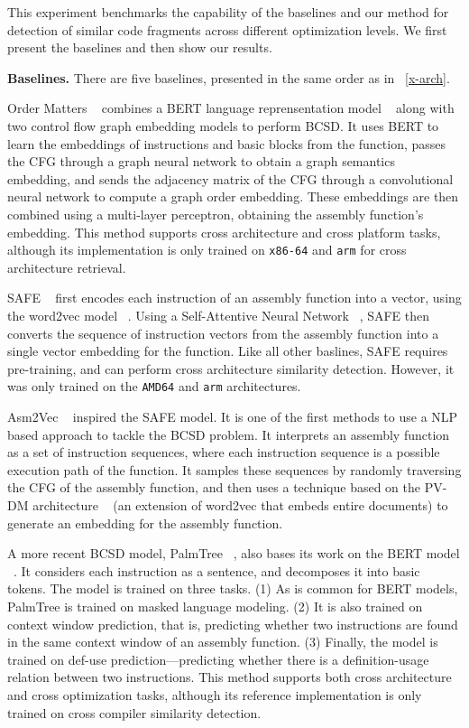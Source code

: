 This experiment benchmarks the capability of the baselines and our method for detection of similar code fragments across
different optimization levels. We first present the baselines and then show our results.

\noindent \textbf{Baselines.} There are five baselines, presented in the same order as in ~\autoref{x-arch}.

Order Matters ~\cite{OrderMatters} combines a BERT language reprensentation
model ~\cite{BERT} along with two control flow graph embedding models
to perform BCSD. It uses BERT to learn the embeddings of instructions and basic blocks from the function,
passes the CFG through a graph neural network to obtain a graph semantics embedding, and sends the adjacency
matrix of the CFG through a convolutional neural network to compute a graph order embedding. These embeddings
are then combined using a multi-layer perceptron, obtaining the assembly function's embedding. This method
supports cross architecture and cross platform tasks, although its implementation is only trained on \texttt{x86-64}
and \texttt{arm} for cross architecture retrieval.

SAFE ~\cite{SAFE} first encodes each instruction of an assembly function into a vector,
using the word2vec model ~\cite{word2vec}. Using a Self-Attentive Neural Network ~\cite{SANN}, SAFE then converts the sequence of instruction
vectors from the assembly function into a single vector embedding for the function. Like all other baslines, SAFE requires
pre-training, and can perform cross architecture similarity detection. However, it was only trained on the \texttt{AMD64}
and \texttt{arm} architectures.

Asm2Vec ~\cite{Asm2Vec} inspired the SAFE model. It is one of the first methods to use a NLP based approach to tackle
the BCSD problem. It interprets an assembly function as a set of instruction sequences, where each instruction sequence
is a possible execution path of the function. It samples these sequences by randomly traversing the CFG of the assembly
function, and then uses a technique based on the PV-DM architecture ~\cite{PV-DM} (an extension of word2vec that embeds entire documents)
to generate an embedding for the assembly function.

A more recent BCSD model, PalmTree ~\cite{PalmTree}, also bases its work on the BERT model ~\cite{BERT}.
It considers each instruction as a sentence, and decomposes it into basic tokens. The model is trained
on three tasks. (1) As is common for BERT models, PalmTree is trained on masked language modeling. (2)
It is also trained on context window prediction, that is, predicting whether two instructions are found
in the same context window of an assembly function. (3) Finally, the model is trained on def-use prediction---predicting
whether there is a definition-usage relation between two instructions. This method supports
both cross architecture and cross optimization tasks, although its reference implementation is only
trained on cross compiler similarity detection.

